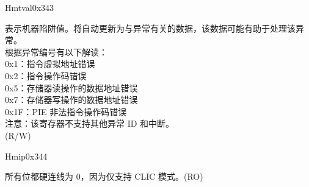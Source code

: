 \begin{register}{H}{mtval}{0x343}\label{regdesc:MTVAL}
%
\regnewline%
\begin{regdesc}\begin{reglist}
\label{fielddesc:MTVAL}\item [MTVAL] 表示机器陷阱值。将自动更新为与异常有关的数据，该数据可能有助于处理该异常。\\
根据异常编号有以下解读：\\
0x1：指令虚拟地址错误\\
0x2：指令操作码错误\\
0x5：存储器读操作的数据地址错误\\
0x7：存储器写操作的数据地址错误\\
0x1F：PIE 非法指令操作码错误\\
注意：该寄存器不支持其他异常 ID 和中断。\\
(R/W)
\end{reglist}\end{regdesc}
\end{register}

\begin{register}{H}{mip}{0x344}\label{regdesc:MIP_REG}
%
\regnewline%
\begin{regdesc}\begin{reglist}
\label{fielddesc:MIP}\item [MIP] 所有位都硬连线为 0，因为仅支持 CLIC 模式。(RO)
\end{reglist}\end{regdesc}
\end{register}

